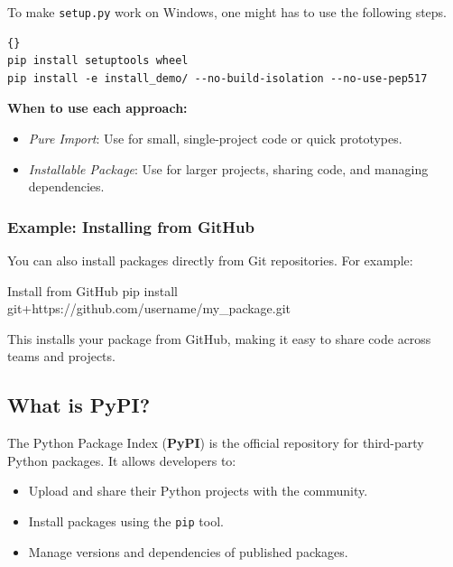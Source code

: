 To make \texttt{setup.py} work on Windows, one might has to use the following steps.
\begin{lstlisting}{}
pip install setuptools wheel
pip install -e install_demo/ --no-build-isolation --no-use-pep517
\end{lstlisting}


%
\noindent \textbf{When to use each approach:}

\begin{itemize}
    \item \emph{Pure Import}: Use for small, single-project code or quick prototypes.
    \item \emph{Installable Package}: Use for larger projects, sharing code, and managing dependencies.
\end{itemize}

%
\subsubsection{Example: Installing from GitHub}


You can also install packages directly from Git repositories. For example:

\begin{codeonly}{Install from GitHub}
pip install git+https://github.com/username/my_package.git
\end{codeonly}

This installs your package from GitHub, making it easy to share code across teams and projects.

\subsection{What is PyPI?}

The Python Package Index (\textbf{PyPI}) is the official repository for third-party Python packages. It allows developers to:

\begin{itemize}
  \item Upload and share their Python projects with the community.
  \item Install packages using the \texttt{pip} tool.
  \item Manage versions and dependencies of published packages.
\end{itemize}

